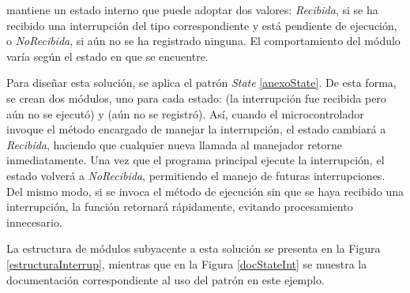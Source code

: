 \Manejador mantiene un estado interno que puede adoptar dos valores: \textit{Recibida}, si se ha recibido una interrupción del tipo correspondiente y está pendiente de ejecución, o \textit{NoRecibida}, si aún no se ha registrado ninguna. El comportamiento del módulo varía según el estado en que se encuentre.

Para diseñar esta solución, se aplica el patrón \textit{State} \ref{anexoState}. De esta forma, se crean dos módulos, uno para cada estado: \Recibida (la interrupción fue recibida pero aún no se ejecutó) y \NoRecibida (aún no se registró). Así, cuando el microcontrolador invoque el método encargado de manejar la interrupción, el estado cambiará a \textit{Recibida}, haciendo que cualquier nueva llamada al manejador retorne inmediatamente. Una vez que el programa principal ejecute la interrupción, el estado volverá a \textit{NoRecibida}, permitiendo el manejo de futuras interrupciones. Del mismo modo, si se invoca el método de ejecución sin que se haya recibido una interrupción, la función retornará rápidamente, evitando procesamiento innecesario.

La estructura de módulos subyacente a esta solución se presenta en la Figura \ref{estructuraInterrup}, mientras que en la Figura \ref{docStateInt} se muestra la documentación correspondiente al uso del patrón en este ejemplo.

